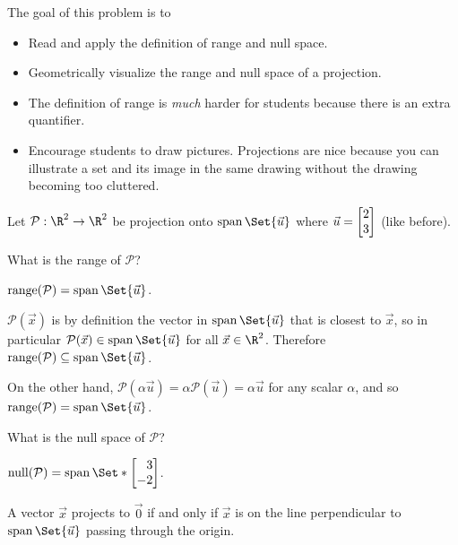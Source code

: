 \documentclass{problemset}
\begin{document}
	\question
	\begin{annotation}
		\begin{goals}

			The goal of this problem is to
			\begin{itemize}
				\item Read and apply the definition of range and null space.
				\item Geometrically visualize the range and null space of a projection.
			\end{itemize}
		\end{goals}

		\begin{notes}
			\begin{itemize}
				\item The definition of range is \emph{much} harder for students
					because there is an extra quantifier.
				\item Encourage students to draw pictures. Projections are nice because you can illustrate
					a set and its image in the same drawing without the drawing becoming too cluttered.
			\end{itemize}
		\end{notes}
	\end{annotation}
	Let $\mathcal P:\R^2\to\R^2$ be projection onto $\Span\Set{\vec u}$ where
	$\vec u=\mat{2\\3}$ (like before).
	\begin{parts}
		\item What is the range of $\mathcal P$?
			\begin{solution}
				$\Range(\mathcal P)=\Span\Set{\vec u}$.

				$\mathcal P(\vec x)$ is by definition the vector in $\Span\Set{\vec u}$
				that is closest to $\vec x$, so in particular
				$\mathcal P(\vec x) \in \Span\Set{\vec u}$ for all $\vec x\in\R^2$.
				Therefore $\Range(\mathcal P)\subseteq\Span\Set{\vec u}$.

				On the other hand, $\mathcal P(\alpha \vec u)=\alpha\mathcal P(\vec u)=\alpha\vec u$
				for any scalar $\alpha$, and so $\Range(\mathcal P)=\Span\Set{\vec u}$.
			\end{solution}
		\item What is the null space of $\mathcal P$?
			\begin{solution}
				\begin{solution}
					$\Null(\mathcal P)=\Span\Set*{\mat{3\\-2}}$.

					A vector $\vec x$ projects to $\vec 0$ if and only if $\vec x$
					is on the line perpendicular to $\Span\Set{\vec u}$ passing
					through the origin.
				\end{solution}
			\end{solution}
	\end{parts}
\end{document}
